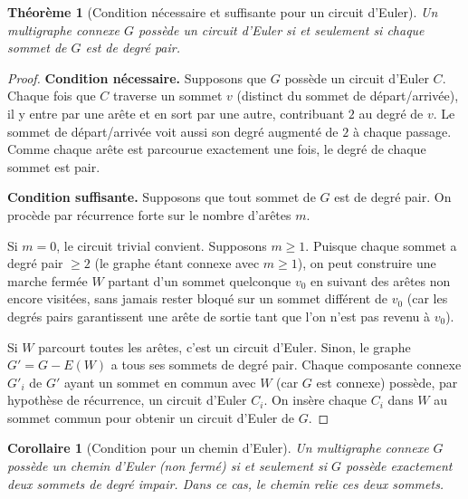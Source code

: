 \documentclass[12pt,a4paper,openany]{book}
\theoremstyle{definition}
\theoremstyle{plain}
\newtheorem{theoreme}[definition]{Théorème}
\newtheorem{corollaire}[definition]{Corollaire}
\theoremstyle{remark}
\begin{document}
\begin{theoreme}[Condition nécessaire et suffisante pour un circuit d'Euler]
\label{thm:euler-circuit}
Un multigraphe connexe $G$ possède un circuit d'Euler si et seulement si
chaque sommet de $G$ est de degré pair.
\end{theoreme}

\begin{proof}
\textbf{Condition nécessaire.}\;
Supposons que $G$ possède un circuit d'Euler $C$. Chaque fois que $C$
traverse un sommet $v$ (distinct du sommet de départ/arrivée), il y entre
par une arête et en sort par une autre, contribuant $2$ au degré de $v$.
Le sommet de départ/arrivée voit aussi son degré augmenté de $2$ à chaque
passage. Comme chaque arête est parcourue exactement une fois, le degré
de chaque sommet est pair.

\medskip\noindent
\textbf{Condition suffisante.}\;
Supposons que tout sommet de $G$ est de degré pair. On procède par
récurrence forte sur le nombre d'arêtes $m$.

Si $m=0$, le circuit trivial convient. Supposons $m \geq 1$. Puisque
chaque sommet a degré pair $\geq 2$ (le graphe étant connexe avec $m\geq 1$),
on peut construire une marche fermée $W$ partant d'un sommet quelconque $v_0$
en suivant des arêtes non encore visitées, sans jamais rester bloqué sur
un sommet différent de $v_0$ (car les degrés pairs garantissent une arête
de sortie tant que l'on n'est pas revenu à $v_0$).

Si $W$ parcourt toutes les arêtes, c'est un circuit d'Euler. Sinon, le
graphe $G' = G - E(W)$ a tous ses sommets de degré pair. Chaque
composante connexe $G'_i$ de $G'$ ayant un sommet en commun avec $W$
(car $G$ est connexe) possède, par hypothèse de récurrence, un circuit
d'Euler $C_i$. On insère chaque $C_i$ dans $W$ au sommet commun pour
obtenir un circuit d'Euler de $G$.
\end{proof}

\begin{corollaire}[Condition pour un chemin d'Euler]
\label{cor:euler-chemin}
Un multigraphe connexe $G$ possède un chemin d'Euler (non fermé) si et
seulement si $G$ possède exactement deux sommets de degré impair. Dans ce
cas, le chemin relie ces deux sommets.
\end{corollaire}
\end{document}
